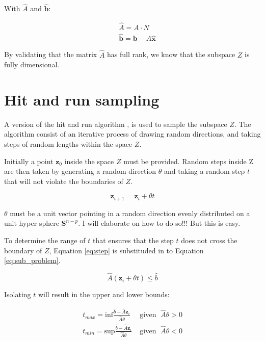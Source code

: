 \documentclass[11pt,a4paper,english]{article}
\begin{document}
With $\hat{A}$ and $ \mathbf{\hat{b}}$:

\begin{align}
	\;            &\;  \hat{A} = A \cdot N \\ 
	\;			& \; \mathbf{\hat{b}} = \mathbf{b}- A\mathbf{\hat{x}}
\end{align}

By validating that the matrix $\hat{A}$ has full rank, we know that the subspace $Z$ is fully dimensional. 

\section{Hit and run sampling}

A version of the hit and run algorithm \cite{Smith1984}, is used to sample the subspace $Z$. The algorithm consist of an iterative process of drawing random directions, and taking steps of random lengths within the space $Z$. 

Initially a point $\mathbf{z}_0$ inside the space $Z$ must be provided. Random steps inside Z are then taken by generating a random direction $\theta$ and taking a random step $t$ that will not violate the boundaries of $Z$. 

\begin{equation}\label{eq:step}
	\mathbf{z}_{i+1} = \mathbf{z}_i + \theta t
\end{equation}

$\theta$ must be a unit vector pointing in a random direction evenly distributed on a unit hyper sphere $\mathbf{S}^{n-p}$. I will elaborate on how to do so!!! But this is easy.

To determine the range of $t$ that ensures that the step $t$ does not cross the boundary of $Z$, Equation \ref{eq:step} is substituded in to Equation \ref{eq:sub_problem}.

\begin{equation}
	\hat{A}(\mathbf{z}_i + \theta t) \leq \hat{b}
\end{equation}

Isolating $t$ will result in the upper and lower bounds:

\begin{align}
t_{max} =  \text{inf} \frac{\hat{b}-\hat{A}\mathbf{z}_i}{\hat{A}\theta}& \; \text{given }  \; \hat{A}\theta>0\\
t_{min} = \text{sup} \frac{\hat{b}-\hat{A}\mathbf{z}_i}{\hat{A}\theta}& \; \text{given }  \; \hat{A}\theta<0
\end{align}
\end{document}
